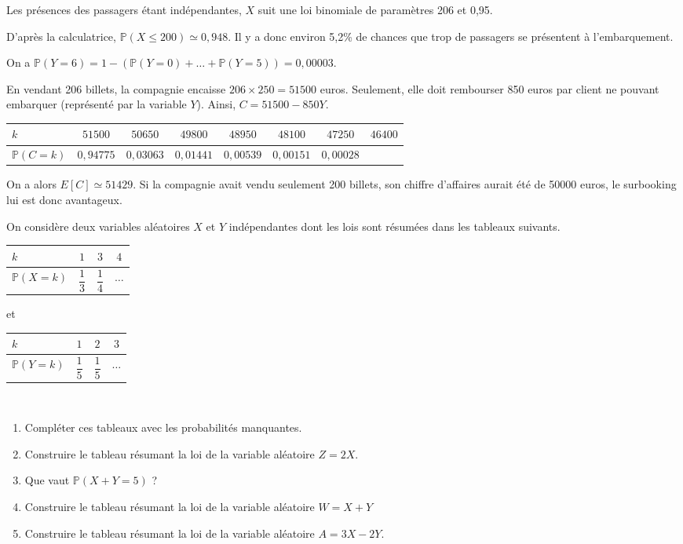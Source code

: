 \documentclass[11pt,fleqn, openany]{book} %
\begin{document}
\begin{solution}Les présences des passagers étant indépendantes, $X$ suit une loi binomiale de paramètres 206 et 0,95. 

D'après la calculatrice, $\mathbb{P}(X \leqslant 200) \simeq 0,948$. Il y a donc environ 5,2\% de chances que trop de passagers se présentent à l'embarquement.

On a $\mathbb{P}(Y=6)=1-(\mathbb{P}(Y=0)+\dots + \mathbb{P}(Y=5))=0,00003$.

En vendant 206 billets, la compagnie encaisse $206 \times 250 = 51500$ euros. Seulement, elle doit rembourser 850 euros par client ne pouvant embarquer (représenté par la variable $Y$). Ainsi, $C=51500-850Y$.

\begin{center}
\begin{tabular}{|l|c|c|c|c|c|c|c|}
\hline
$k$ & $51500$& $50650$ & $49800$ & $48950$ & $48100$ & $47250$ & $46400$ \\
\hline
$\mathbb{P}(C=k)$ & $0,94775$ & $0,03063$ & $0,01441$   & $0,00539$ & $0,00151$ & $0,00028$ & \\
\hline \end{tabular}
\end{center}

On a alors $E[C]\simeq 51429$. Si la compagnie avait vendu seulement 200 billets, son chiffre d'affaires aurait été de 50000 euros, le surbooking lui est donc avantageux.\end{solution}





\begin{exercise}On considère deux variables aléatoires $X$ et $Y$ indépendantes dont les lois sont résumées dans les tableaux suivants.
\vskip10pt
\renewcommand{\arraystretch}{2.2}
\hfill
\begin{tabular}{|l|c|c|c|}
\hline
$k$ & $1$& $3$ & $4$  \\
\hline
$\mathbb{P}(X=k)$ & $\dfrac{1}{3}$ & $\dfrac{1}{4}$ & $\ldots$ \\
\hline \end{tabular}\hfill
et
\hfill
\begin{tabular}{|l|c|c|c|}
\hline
$k$ & $1$& $2$ & $3$ \\
\hline
$\mathbb{P}(Y=k)$ & $\dfrac{1}{5}$ & $\dfrac{1}{5}$ & $\ldots$ \\
\hline \end{tabular}\hfill~
\vskip10pt
\begin{enumerate}
\item Compléter ces tableaux avec les probabilités manquantes.
\item Construire le tableau résumant la loi de la variable aléatoire $Z=2X$.
\item Que vaut $\mathbb{P}(X+Y=5)$ ?
\item Construire le tableau résumant la loi de la variable aléatoire $W=X+Y$
\item Construire le tableau résumant la loi de la variable aléatoire $A=3X-2Y$.
\end{enumerate}\end{exercise}
\end{document}
